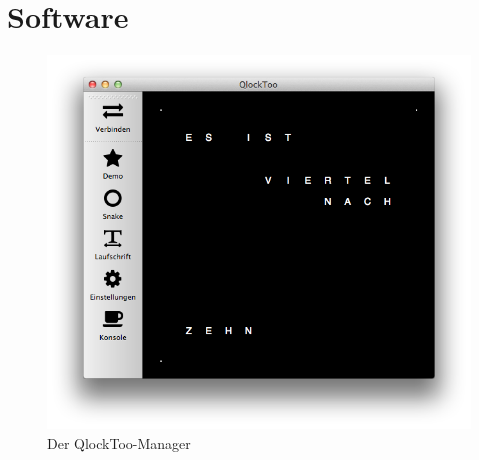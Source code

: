 \section{Software}
\label{sec:Software}

\begin{figure}[t]
    \centering
    \includegraphics[width=.8\textwidth]{Abbildungen/Software/Manager}
    \caption[QlockToo-Manager]{Der QlockToo-Manager}
    \label{fig:Manager}
\end{figure}

